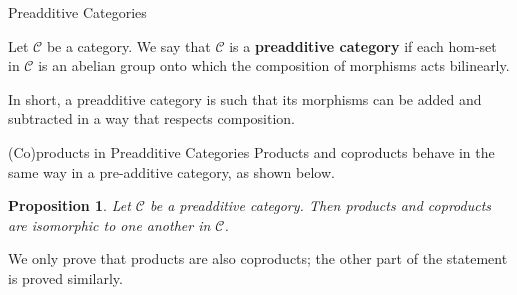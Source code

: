 \documentclass{beamer}
\newtheorem{proposition}{Proposition}
\begin{document}
\begin{frame}{Preadditive Categories}
    \begin{definition}
        Let $\mathcal{C}$ be a category. We say that $\mathcal{C}$
        is a \textbf{preadditive category} if each hom-set in
        $\mathcal{C}$ is an abelian group onto which the composition of
        morphisms acts bilinearly.
    \end{definition}

    In short, a preadditive category is such that its morphisms can
    be added and subtracted in a way that respects composition.
\end{frame}

\begin{frame}{(Co)products in Preadditive Categories}
    Products and coproducts behave in the same way in a
    pre-additive category, as shown below. \smallskip

    \begin{proposition}
        Let $\mathcal{C}$ be a preadditive category. Then
        products and coproducts are isomorphic to one
        another in $\mathcal{C}$.
    \end{proposition}

    We only prove that products are also coproducts; the other part of
    the statement is proved similarly.
\end{frame}
\end{document}
